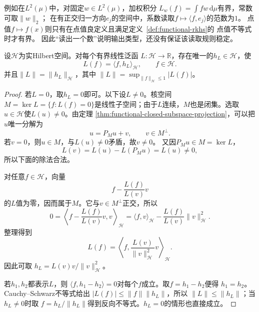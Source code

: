 例如在$L^2(\mu)$中，对固定$w\in L^2(\mu)$，加权积分
$L_w(f)=\int fw\,\mathrm d\mu$有界，常数可取$\lVert w\rVert_2$；
在有正交归一方向$e_j$的空间中，系数读取$f\mapsto\langle f,e_j\rangle$的范数为$1$。
点值$f\mapsto f(x)$则只有在点值良定义且满足定义~\ref{def:functional-rkhs}的
点值不等式时才有界。
因此“读出一个数”说明输出类型，还没有保证该读取规则稳定。

\begin{theorem}[Riesz表示定理]
\label{thm:functional-riesz-representation}
设$\mathcal{H}$为实Hilbert空间。对每个有界线性泛函
$L:\mathcal{H}\to\mathbb{R}$，存在唯一的$h_L\in\mathcal{H}$，使
\begin{equation}
  L(f)=\langle f,h_L\rangle_{\mathcal{H}},
  \qquad f\in\mathcal{H}.
  \label{eq:functional-riesz-representation}
\end{equation}
并且$\lVert L\rVert=\lVert h_L\rVert_{\mathcal{H}}$，其中
$\lVert L\rVert=\sup_{\lVert f\rVert_{\mathcal{H}}\leq1}|L(f)|$。
\end{theorem}

\begin{proof}
若$L=0$，取$h_L=0$即可。以下设$L\neq0$。核空间
$M=\ker L=\{f:L(f)=0\}$是线性子空间；由于$L$连续，$M$也是闭集。选取
$u\in\mathcal{H}$使$L(u)\neq0$。由定理
\ref{thm:functional-closed-subspace-projection}，可以把$u$唯一分解为
\[
  u=P_Mu+v,\qquad v\in M^\perp.
\]
若$v=0$，则$u\in M$，与$L(u)\neq0$矛盾，故$v\neq0$。
又因$P_Mu\in M=\ker L$，
\[
  L(v)=L(u)-L(P_Mu)=L(u)\neq0,
\]
所以下面的除法合法。

对任意$f\in\mathcal{H}$，向量
\[
  f-\frac{L(f)}{L(v)}v
\]
的$L$值为零，因而属于$M$。它与$v\in M^\perp$正交，所以
\[
  0
  =
  \left\langle
    f-\frac{L(f)}{L(v)}v,v
  \right\rangle_{\mathcal{H}}
  =
  \langle f,v\rangle_{\mathcal{H}}
  -
  \frac{L(f)}{L(v)}\lVert v\rVert_{\mathcal{H}}^2.
\]
整理得到
\[
  L(f)
  =
  \left\langle
    f,\frac{L(v)}{\lVert v\rVert_{\mathcal{H}}^2}v
  \right\rangle_{\mathcal{H}}.
\]
因此可取
$h_L=L(v)v/\lVert v\rVert_{\mathcal{H}}^2$。

若$h_1,h_2$都表示$L$，则
$\langle f,h_1-h_2\rangle=0$对每个$f$成立。取$f=h_1-h_2$便得
$h_1=h_2$。Cauchy--Schwarz不等式给出
$|L(f)|\leq\lVert f\rVert\lVert h_L\rVert$，所以
$\lVert L\rVert\leq\lVert h_L\rVert$；当$h_L\neq0$时取
$f=h_L/\lVert h_L\rVert$得到反向不等式。$h_L=0$的情形也直接成立。
\end{proof}

